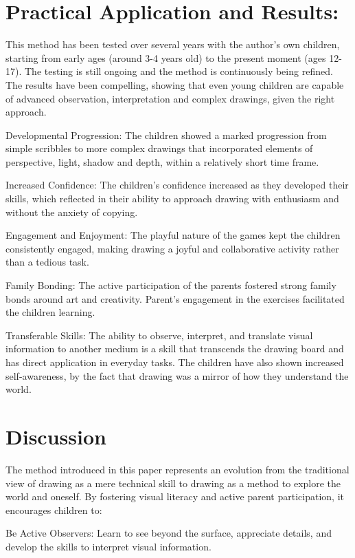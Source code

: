 \documentclass{article}
\begin{document}
\section{Practical Application and Results:}

This method has been tested over several years with the author’s own children, starting from early ages (around 3-4 years old) to the present moment (ages 12-17). The testing is still ongoing and the method is continuously being refined. The results have been compelling, showing that even young children are capable of advanced observation, interpretation and complex drawings, given the right approach.

Developmental Progression: The children showed a marked progression from simple scribbles to more complex drawings that incorporated elements of perspective, light, shadow and depth, within a relatively short time frame.

Increased Confidence: The children’s confidence increased as they developed their skills, which reflected in their ability to approach drawing with enthusiasm and without the anxiety of copying.

Engagement and Enjoyment: The playful nature of the games kept the children consistently engaged, making drawing a joyful and collaborative activity rather than a tedious task.

Family Bonding: The active participation of the parents fostered strong family bonds around art and creativity. Parent’s engagement in the exercises facilitated the children learning.

Transferable Skills: The ability to observe, interpret, and translate visual information to another medium is a skill that transcends the drawing board and has direct application in everyday tasks. The children have also shown increased self-awareness, by the fact that drawing was a mirror of how they understand the world.

\section{Discussion}

The method introduced in this paper represents an evolution from the traditional view of drawing as a mere technical skill to drawing as a method to explore the world and oneself. By fostering visual literacy and active parent participation, it encourages children to:

Be Active Observers: Learn to see beyond the surface, appreciate details, and develop the skills to interpret visual information.
\end{document}
